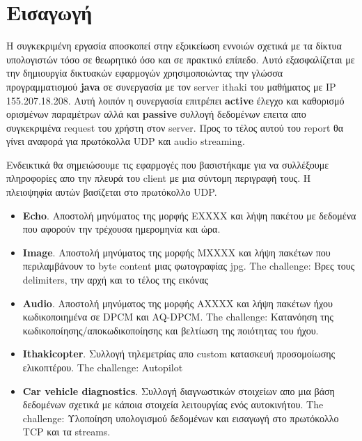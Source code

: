 \documentclass[hidelinks, 12pt, a4paper]{article}
\begin{document}
\sloppy %




\pagebreak
\tableofcontents
\pagebreak



\section{Εισαγωγή}

Η συγκεκριμένη εργασία αποσκοπεί στην εξοικείωση εννοιών σχετικά με τα δίκτυα υπολογιστών τόσο σε θεωρητικό όσο και σε πρακτικό επίπεδο. Αυτό εξασφαλίζεται με την δημιουργία δικτυακών εφαρμογών χρησιμοποιώντας την γλώσσα προγραμματισμού \textbf{java} σε συνεργασία με τον server ithaki του μαθήματος με IP 155.207.18.208. Αυτή λοιπόν η συνεργασία επιτρέπει \textbf{active} έλεγχο και καθορισμό ορισμένων παραμέτρων αλλά και \textbf{passive} συλλογή δεδομένων επειτα απο συγκεκριμένα request του χρήστη στον server. Προς το τέλος αυτού του report θα γίνει αναφορά για πρωτόκολλα UDP και audio streaming.

Ενδεικτικά θα σημειώσουμε τις εφαρμογές που βασιστήκαμε για να συλλέξουμε πληροφορίες απο την πλευρά του client με μια σύντομη περιγραφή τους. Η πλειοψηφία αυτών βασίζεται στο πρωτόκολλο UDP. 
\begin{itemize}
    \item \textbf{Echo}.
        Αποστολή μηνύματος της μορφής ΕΧΧΧX και λήψη πακέτου με δεδομένα που αφορούν την τρέχουσα ημερομηνία και ώρα.
    \item \textbf{Image}.
        Αποστολή μηνύματος της μορφής ΜΧΧΧΧ και λήψη πακέτων που περιλαμβάνουν το byte content μιας φωτογραφίας jpg. The challenge: Βρες τους delimiters, την αρχή και το τέλος της εικόνας 
    \item \textbf{Audio}.
        Αποστολή μηνύματος της μορφής ΑΧΧΧΧ και λήψη πακέτων ήχου κωδικοποιημένα σε DPCM και AQ-DPCM. The challenge: Κατανόηση της κωδικοποίησης/αποκωδικοποίησης και βελτίωση της ποιότητας του ήχου.
    \item \textbf{Ithakicopter}. Συλλογή τηλεμετρίας απο custom κατασκευή προσομοίωσης ελικοπτέρου. The challenge: Autopilot
    \item \textbf{Car vehicle diagnostics}. Συλλογή διαγνωστικών στοιχείων απο μια βάση δεδομένων σχετικά με κάποια στοιχεία λειτουργίας ενός αυτοκινήτου. The challenge: Υλοποίηση υπολογισμού δεδομένων και εισαγωγή στο πρωτόκολλο TCP και τα streams.
\end{itemize}
\end{document}
